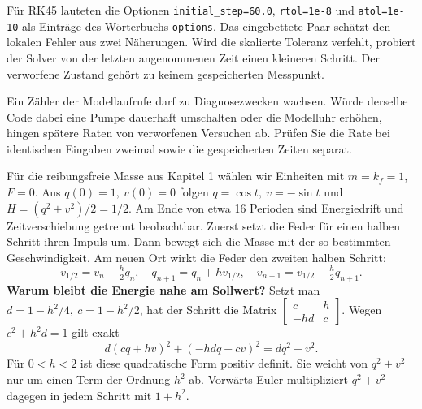 Für RK45 lauteten die Optionen \texttt{initial\_step=60.0}, \texttt{rtol=1e-8} und \texttt{atol=1e-10} als Einträge des Wörterbuchs \texttt{options}. Das eingebettete Paar schätzt den lokalen Fehler aus zwei Näherungen. Wird die skalierte Toleranz verfehlt, probiert der Solver von der letzten angenommenen Zeit einen kleineren Schritt. Der verworfene Zustand gehört zu keinem gespeicherten Messpunkt.

Ein Zähler der Modellaufrufe darf zu Diagnosezwecken wachsen. Würde derselbe Code dabei eine Pumpe dauerhaft umschalten oder die Modelluhr erhöhen, hingen spätere Raten von verworfenen Versuchen ab. Prüfen Sie die Rate bei identischen Eingaben zweimal sowie die gespeicherten Zeiten separat.

Für die reibungsfreie Masse aus Kapitel 1 wählen wir Einheiten mit \(m=k_f=1\), \(F=0\). Aus \(q(0)=1,\ v(0)=0\) folgen \(q=\cos t,\ v=-\sin t\) und \(H=(q^2+v^2)/2=1/2\). Am Ende von etwa 16 Perioden sind Energiedrift und Zeitverschiebung getrennt beobachtbar.
Zuerst setzt die Feder für einen halben Schritt ihren Impuls um. Dann bewegt sich die Masse mit der so bestimmten Geschwindigkeit. Am neuen Ort wirkt die Feder den zweiten halben Schritt:
\[
 v_{1/2}=v_n-\tfrac h2 q_n,\quad q_{n+1}=q_n+h v_{1/2},\quad
 v_{n+1}=v_{1/2}-\tfrac h2q_{n+1}.
\]
\textbf{Warum bleibt die Energie nahe am Sollwert?} Setzt man \(d=1-h^2/4,\ c=1-h^2/2\), hat der Schritt die Matrix \(\left[\begin{smallmatrix}c&h\\-hd&c\end{smallmatrix}\right]\). Wegen \(c^2+h^2d=1\) gilt exakt
\[
 d(cq+hv)^2+(-hdq+cv)^2=dq^2+v^2 .
\]
Für \(0<h<2\) ist diese quadratische Form positiv definit. Sie weicht von \(q^2+v^2\) nur um einen Term der Ordnung \(h^2\) ab. Vorwärts Euler multipliziert \(q^2+v^2\) dagegen in jedem Schritt mit \(1+h^2\).

